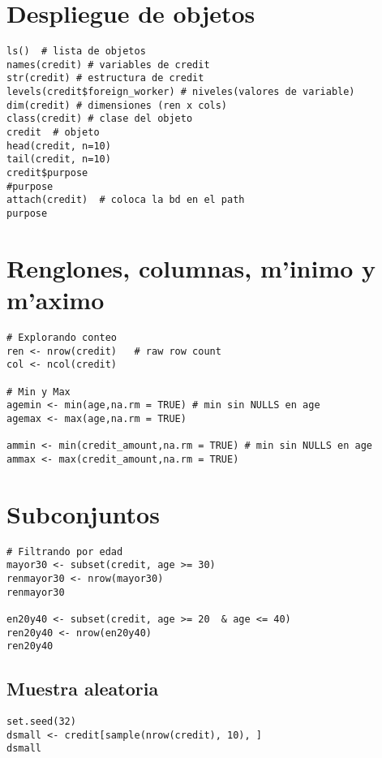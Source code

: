 \section{Despliegue de objetos}
\begin{verbatim}
ls()  # lista de objetos
names(credit) # variables de credit
str(credit) # estructura de credit
levels(credit$foreign_worker) # niveles(valores de variable)
dim(credit) # dimensiones (ren x cols)
class(credit) # clase del objeto
credit  # objeto
head(credit, n=10)
tail(credit, n=10)
credit$purpose
#purpose
attach(credit)  # coloca la bd en el path
purpose
\end{verbatim}
\section{Renglones, columnas, m'inimo y m'aximo}

\begin{verbatim}
# Explorando conteo
ren <- nrow(credit)   # raw row count
col <- ncol(credit)

# Min y Max 
agemin <- min(age,na.rm = TRUE) # min sin NULLS en age
agemax <- max(age,na.rm = TRUE)

ammin <- min(credit_amount,na.rm = TRUE) # min sin NULLS en age
ammax <- max(credit_amount,na.rm = TRUE)
\end{verbatim}
\section{Subconjuntos}

\begin{verbatim}
# Filtrando por edad
mayor30 <- subset(credit, age >= 30)
renmayor30 <- nrow(mayor30)
renmayor30

en20y40 <- subset(credit, age >= 20  & age <= 40)
ren20y40 <- nrow(en20y40)
ren20y40
\end{verbatim}

\subsection{Muestra aleatoria}

\begin{verbatim}
set.seed(32) 
dsmall <- credit[sample(nrow(credit), 10), ]
dsmall
\end{verbatim}

